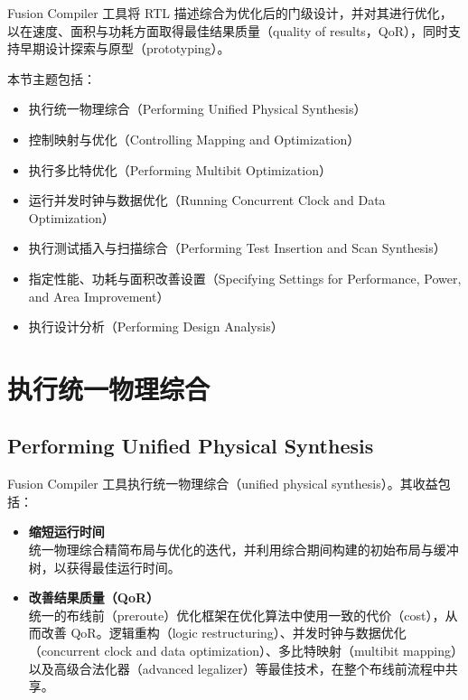 \label{chap:physyn}

Fusion Compiler 工具将 RTL 描述综合为优化后的门级设计，并对其进行优化，以在速度、面积与功耗方面取得最佳结果质量（quality of results，QoR），同时支持早期设计探索与原型（prototyping）。

本节主题包括：
\begin{itemize}
  \item 执行统一物理综合（Performing Unified Physical Synthesis）
  \item 控制映射与优化（Controlling Mapping and Optimization）
  \item 执行多比特优化（Performing Multibit Optimization）
  \item 运行并发时钟与数据优化（Running Concurrent Clock and Data Optimization）
  \item 执行测试插入与扫描综合（Performing Test Insertion and Scan Synthesis）
  \item 指定性能、功耗与面积改善设置（Specifying Settings for Performance, Power, and Area Improvement）
  \item 执行设计分析（Performing Design Analysis）
\end{itemize}

\section{执行统一物理综合}
\subsection*{Performing Unified Physical Synthesis}

Fusion Compiler 工具执行统一物理综合（unified physical synthesis）。其收益包括：
\begin{itemize}
  \item \textbf{缩短运行时间}\\
    统一物理综合精简布局与优化的迭代，并利用综合期间构建的初始布局与缓冲树，以获得最佳运行时间。
  \item \textbf{改善结果质量（QoR）}\\
    统一的布线前（preroute）优化框架在优化算法中使用一致的代价（cost），从而改善 QoR。逻辑重构（logic restructuring）、并发时钟与数据优化（concurrent clock and data optimization）、多比特映射（multibit mapping）以及高级合法化器（advanced legalizer）等最佳技术，在整个布线前流程中共享。
\end{itemize}

